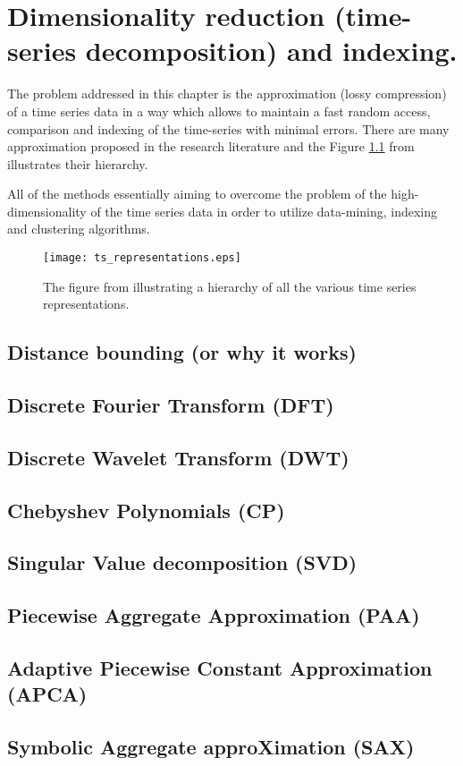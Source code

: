 \chapter{Dimensionality reduction (time-series decomposition) and indexing.}
The problem addressed in this chapter is the approximation (lossy compression) of a time series data in a way which allows to maintain a fast random access, comparison and indexing of the time-series with minimal errors. There are many approximation proposed in the research literature and the Figure \ref{fig:approximations} from \cite{citeulike:2821475} illustrates their hierarchy.

All of the methods essentially aiming to overcome the problem of the high-dimensionality of the time series data in order to utilize data-mining, indexing and clustering algorithms. 


\begin{figure}[tbp]
   \centering
   \texttt{[image: ts\_representations.eps]}
   \caption{The figure from \cite{citeulike:2821475} illustrating a hierarchy of all the various time series representations.}
   \label{fig:approximations}
\end{figure} 

\section{Distance bounding (or why it works)}

\section{Discrete Fourier Transform (DFT)}

\section{Discrete Wavelet Transform (DWT)}

\section{Chebyshev Polynomials (CP)}

\section{Singular Value decomposition (SVD)}

\section{Piecewise Aggregate Approximation (PAA)}

\section{Adaptive Piecewise Constant Approximation (APCA)}

\section{Symbolic Aggregate approXimation (SAX)}